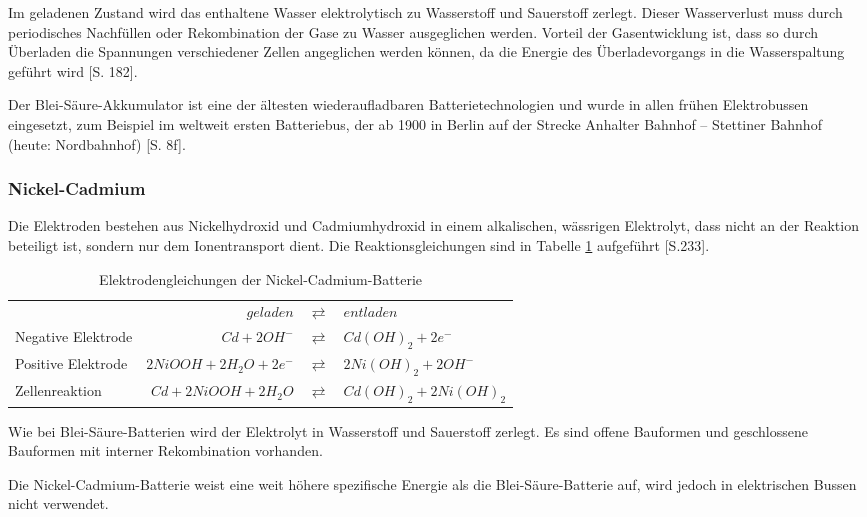 Im geladenen Zustand wird das enthaltene Wasser elektrolytisch zu Wasserstoff und Sauerstoff zerlegt. Dieser Wasserverlust muss durch periodisches Nachfüllen oder Rekombination der Gase zu Wasser ausgeglichen werden. Vorteil der Gasentwicklung ist, dass so durch Überladen die Spannungen verschiedener Zellen angeglichen werden können, da die Energie des Überladevorgangs in die Wasserspaltung geführt wird \cite{tub_aleph001746639}[S. 182].

Der Blei-Säure-Akkumulator ist eine der ältesten wiederaufladbaren Batterietechnologien und wurde in allen frühen Elektrobussen eingesetzt, zum Beispiel im weltweit ersten Batteriebus, der ab 1900 in Berlin auf der Strecke Anhalter Bahnhof – Stettiner Bahnhof (heute: Nordbahnhof) \cite{Risch:1957}[S. 8f]. 

\subsubsection{Nickel-Cadmium}
Die Elektroden bestehen aus Nickelhydroxid und Cadmiumhydroxid in einem alkalischen, wässrigen Elektrolyt, dass nicht an der Reaktion beteiligt ist, sondern nur dem Ionentransport dient. Die Reaktionsgleichungen sind in Tabelle \ref{NiCd} aufgeführt \cite{Sterner:2014}[S.233].

\begin{table}\centering
	\begin{tabularx}{\linewidth}{XrcX}
		&               $geladen$ & $\rightleftarrows$ & $entladen$             \\
		Negative Elektrode &            $Cd + 2OH^-$ & $\rightleftarrows$ & $Cd(OH)_2 + 2e^-$      \\
		Positive Elektrode & $2NiOOH + 2H_2O + 2e^-$ & $\rightleftarrows$ & $2Ni(OH)_2 + 2OH^-$    \\ \midrule
		Zellenreaktion     &   $Cd + 2NiOOH + 2H_2O$ & $\rightleftarrows$ & $Cd(OH)_2 + 2Ni(OH)_2$ \\
	\end{tabularx}
	\caption{Elektrodengleichungen der Nickel-Cadmium-Batterie}
	\label{NiCd}
\end{table}

Wie bei Blei-Säure-Batterien wird der Elektrolyt in Wasserstoff und Sauerstoff zerlegt. Es sind offene Bauformen und geschlossene Bauformen mit interner Rekombination vorhanden.

Die Nickel-Cadmium-Batterie weist eine weit höhere spezifische Energie als die Blei-Säure-Batterie auf, wird jedoch in elektrischen Bussen nicht verwendet. 

